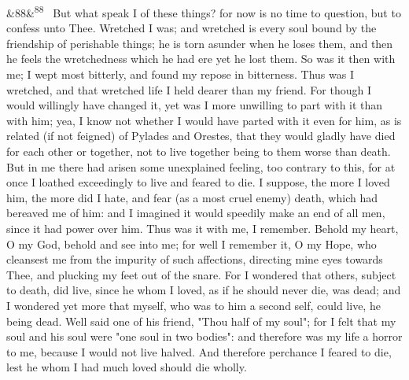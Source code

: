 \documentclass[12pt]{article}
\newcommand{\para}[1][]{\par\noindent\ifx&#1&\else\textsuperscript{\footnotesize #1}~\fi}
\begin{document}
\para[88] But what speak I of these things? for now is no time to question, but to confess unto Thee. Wretched I was; and wretched is every soul bound by the friendship of perishable things; he is torn asunder when he loses them, and then he feels the wretchedness which he had ere yet he lost them. So was it then with me; I wept most bitterly, and found my repose in bitterness. Thus was I wretched, and that wretched life I held dearer than my friend. For though I would willingly have changed it, yet was I more unwilling to part with it than with him; yea, I know not whether I would have parted with it even for him, as is related (if not feigned) of Pylades and Orestes, that they would gladly have died for each other or together, not to live together being to them worse than death. But in me there had arisen some unexplained feeling, too contrary to this, for at once I loathed exceedingly to live and feared to die. I suppose, the more I loved him, the more did I hate, and fear (as a most cruel enemy) death, which had bereaved me of him: and I imagined it would speedily make an end of all men, since it had power over him. Thus was it with me, I remember. Behold my heart, O my God, behold and see into me; for well I remember it, O my Hope, who cleansest me from the impurity of such affections, directing mine eyes towards Thee, and plucking my feet out of the snare. For I wondered that others, subject to death, did live, since he whom I loved, as if he should never die, was dead; and I wondered yet more that myself, who was to him a second self, could live, he being dead. Well said one of his friend, "Thou half of my soul"; for I felt that my soul and his soul were "one soul in two bodies": and therefore was my life a horror to me, because I would not live halved. And therefore perchance I feared to die, lest he whom I had much loved should die wholly.
\end{document}

